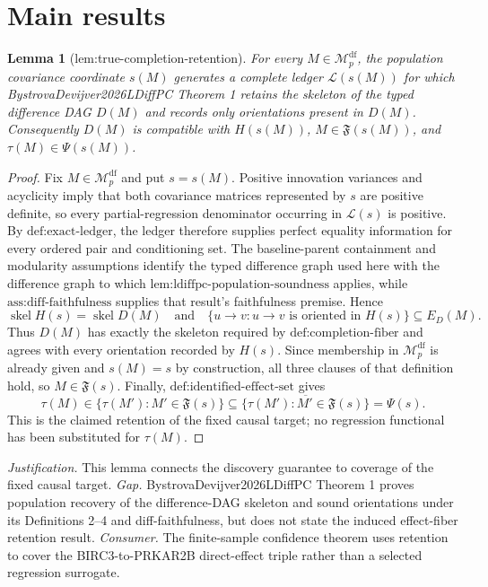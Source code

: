 \documentclass{article}
\newtheorem{lemma}{Lemma}
\begin{document}
\section{Main results}

\begin{lemma}[lem:true-completion-retention]\label{lem:true-completion-retention}
For every \(M\in\mathcal M_p^{\mathrm{df}}\), the population covariance coordinate \(s(M)\) generates a complete ledger \(\mathcal L(s(M))\) for which BystrovaDevijver2026LDiffPC Theorem 1 retains the skeleton of the typed difference DAG \(D(M)\) and records only orientations present in \(D(M)\). Consequently \(D(M)\) is compatible with \(H(s(M))\), \(M\in\mathfrak F(s(M))\), and \(\tau(M)\in\Psi(s(M))\).
\end{lemma}
\begin{proof}
Fix \(M\in\mathcal M_p^{\mathrm{df}}\) and put \(s=s(M)\).  Positive innovation variances and acyclicity imply that both covariance matrices represented by \(s\) are positive definite, so every partial-regression denominator occurring in \(\mathcal L(s)\) is positive.  By \(\text{def:exact-ledger}\), the ledger therefore supplies perfect equality information for every ordered pair and conditioning set.  The baseline-parent containment and modularity assumptions identify the typed difference graph used here with the difference graph to which \(\text{lem:ldiffpc-population-soundness}\) applies, while \(\text{ass:diff-faithfulness}\) supplies that result's faithfulness premise.  Hence
\[
 \operatorname{skel} H(s)=\operatorname{skel}D(M)
 \quad\text{and}\quad
 \{u\to v:u\to v\text{ is oriented in }H(s)\}
 \subseteq E_D(M).
\]
Thus \(D(M)\) has exactly the skeleton required by \(\text{def:completion-fiber}\) and agrees with every orientation recorded by \(H(s)\).  Since membership in \(\mathcal M_p^{\mathrm{df}}\) is already given and \(s(M)=s\) by construction, all three clauses of that definition hold, so \(M\in\mathfrak F(s)\).  Finally, \(\text{def:identified-effect-set}\) gives
\[
 \tau(M)\in\{\tau(M'):M'\in\mathfrak F(s)\}
 \subseteq\overline{\{\tau(M'):M'\in\mathfrak F(s)\}}=\Psi(s).
\]
This is the claimed retention of the fixed causal target; no regression functional has been substituted for \(\tau(M)\).
\end{proof}
\par\smallskip\noindent \textit{Justification.} This lemma connects the discovery guarantee to coverage of the fixed causal target. \textit{Gap.} BystrovaDevijver2026LDiffPC Theorem 1 proves population recovery of the difference-DAG skeleton and sound orientations under its Definitions 2--4 and diff-faithfulness, but does not state the induced effect-fiber retention result. \textit{Consumer.} The finite-sample confidence theorem uses retention to cover the BIRC3-to-PRKAR2B direct-effect triple rather than a selected regression surrogate.
\end{document}

